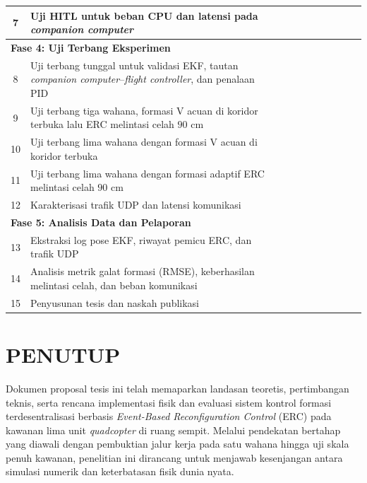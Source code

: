 \documentclass[12pt,a4paper]{report}
\begin{document}
\begin{table}[htbp]
{\begin{tabular}{|c|p{11.5cm}|c|c|c|c|c|c|c|c|c|}
        7 & Uji HITL\label{abbr:hitl} untuk beban CPU dan latensi pada \textit{companion computer} &  &  &  & \cellcolor{gray!70} & \cellcolor{gray!70} &  &  &  &  \\ \hline
        \multicolumn{11}{|l|}{\cellcolor{gray!10}\textbf{Fase 4: Uji Terbang Eksperimen}} \\ \hline
        8 & Uji terbang tunggal untuk validasi EKF, tautan \textit{companion computer}--\textit{flight controller}, dan penalaan PID\label{abbr:pid} &  &  &  & \cellcolor{gray!70} & \cellcolor{gray!70} &  &  &  &  \\ \hline
        9 & Uji terbang tiga wahana, formasi V acuan di koridor terbuka lalu ERC melintasi celah $90$ cm &  &  &  &  & \cellcolor{gray!70} & \cellcolor{gray!70} &  &  &  \\ \hline
        10 & Uji terbang lima wahana dengan formasi V acuan di koridor terbuka &  &  &  &  &  & \cellcolor{gray!70} & \cellcolor{gray!70} &  &  \\ \hline
        11 & Uji terbang lima wahana dengan formasi adaptif ERC melintasi celah $90$ cm &  &  &  &  &  &  & \cellcolor{gray!70} & \cellcolor{gray!70} &  \\ \hline
        12 & Karakterisasi trafik UDP dan latensi komunikasi &  &  &  &  &  &  & \cellcolor{gray!70} & \cellcolor{gray!70} &  \\ \hline
        \multicolumn{11}{|l|}{\cellcolor{gray!10}\textbf{Fase 5: Analisis Data dan Pelaporan}} \\ \hline
        13 & Ekstraksi log pose EKF, riwayat pemicu ERC, dan trafik UDP &  &  &  &  &  &  &  &  & \cellcolor{gray!70} \\ \hline
        14 & Analisis metrik galat formasi (RMSE\label{abbr:rmse}), keberhasilan melintasi celah, dan beban komunikasi &  &  &  &  &  &  &  &  & \cellcolor{gray!70} \\ \hline
        15 & Penyusunan tesis dan naskah publikasi &  &  &  &  &  &  &  &  & \cellcolor{gray!70} \\ \hline
    \end{tabular}%
    }
\end{table}

\chapter{PENUTUP}
Dokumen proposal tesis ini telah memaparkan landasan teoretis, pertimbangan teknis, serta rencana implementasi fisik dan evaluasi sistem kontrol formasi terdesentralisasi berbasis \textit{Event-Based Reconfiguration Control} (ERC) pada kawanan lima unit \textit{quadcopter} di ruang sempit. Melalui pendekatan bertahap yang diawali dengan pembuktian jalur kerja pada satu wahana hingga uji skala penuh kawanan, penelitian ini dirancang untuk menjawab kesenjangan antara simulasi numerik dan keterbatasan fisik dunia nyata. 
\end{document}
